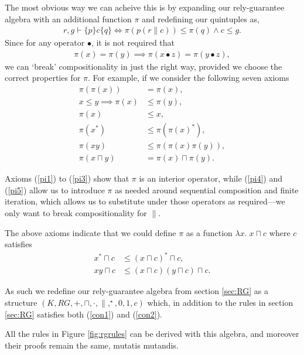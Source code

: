\documentclass{llncs}
\begin{document}
The most obvious way we can acheive this is by expanding our
rely-guarantee algebra with an additional function $\pi$ and redefining
our quintuples as,
\begin{align*}
r, g \vdash \{p\} c \{q\} \iff \pi(p(r\|c)) \le \pi(q) \land c \le g.
\end{align*}
Since for any operator $\bullet$, it is not required that
\begin{align*}
\pi(x) = \pi(y) \implies \pi(x \bullet z) = \pi(y \bullet z),
\end{align*}
we can `break' compositionality in just the right way, provided we
choose the correct properties for $\pi$. For example, if we consider
the following seven axioms
\begin{align}
\pi(\pi(x)) &= \pi(x), \label{pi1}\\
x \le y \implies \pi(x) &\le \pi(y), \label{pi2}\\
\pi(x) &\le x, \label{pi3}\\
\pi(x^*) &\le \pi(\pi(x)^*), \label{pi4}\\
\pi(xy) &\le \pi(\pi(x)\pi(y)), \label{pi5}\\
\pi(x \sqcap y) &= \pi(x) \sqcap \pi(y). \label{pi6}
\end{align}

Axioms (\ref{pi1}) to (\ref{pi3}) show that $\pi$ is an interior
operator, while (\ref{pi4}) and (\ref{pi5}) allow us to introduce
$\pi$ as needed around sequential composition and finite iteration,
which allows us to substitute under those operators as required---we
only want to break compositionality for $\|$.

The above axioms indicate that we could define $\pi$ as a function
$\lambda x.\; x \sqcap c$ where $c$ satisfies
\begin{align}
x^* \sqcap c &\le (x \sqcap c)^* \sqcap c, \label{con1}\\
xy \sqcap c &\le (x \sqcap c)(y \sqcap c) \sqcap c. \label{con2}
\end{align}

As such we redefine our rely-guarantee algebra from section
\ref{sec:RG} as a structure $(K,RG,+,\sqcap,\cdot,\|,^\star,0,1,c)$
which, in addition to the rules in section \ref{sec:RG} satisfies both
(\ref{con1}) and (\ref{con2}).

All the rules in Figure \ref{fig:rgrules} can be derived with this
algebra, and moreover their proofs remain the same, mutatis
mutandis.

\end{document}
